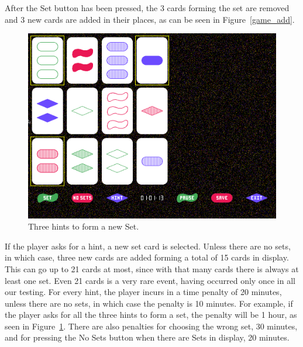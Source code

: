 \documentclass[11pt,a4paper,reqno]{report}
\numberwithin{equation}{section}
\begin{document}
After the Set button has been pressed, the 3 cards forming the set are removed and 3 new cards are added in their places, as can be seen in Figure~\ref{game_add}.

\begin{figure}[htbp]
\begin{center}
\includegraphics[scale=0.3]{game_hint.png}
\caption{Three hints to form a new Set.}
\label{game_hint}
\end{center}
\end{figure}

If the player asks for a hint, a new set card is selected. Unless there are no sets, in which case, three new cards are added forming a total of 15 cards in display. This can go up to 21 cards at most, since with that many cards there is always at least one set. Even 21 cards is a very rare event, having occurred only once in all our testing. For every hint, the player incurs in a time penalty of 20 minutes, unless there are no sets, in which case the penalty is 10 minutes. For example, if the player asks for all the three hints to form a set, the penalty will be 1 hour, as seen in Figure~\ref{game_hint}. There are also penalties for choosing the wrong set, 30 minutes, and for pressing the No Sets button when there are Sets in display, 20 minutes.
\end{document}
